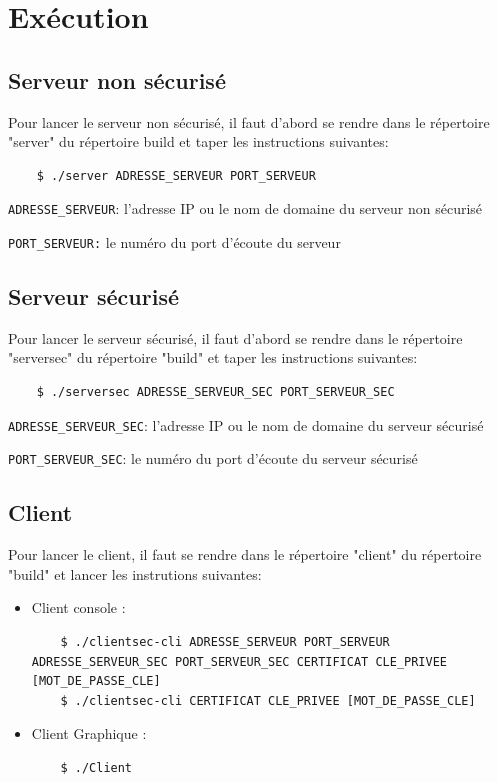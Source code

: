 \documentclass[a4paper,11pt,french]{book}
\begin{document}
\section{Exécution}
\subsection{Serveur non sécurisé}
Pour lancer le serveur non sécurisé, il faut d'abord se rendre dans le répertoire "server" du répertoire build et taper les instructions suivantes:

\begin{verbatim}
    $ ./server ADRESSE_SERVEUR PORT_SERVEUR
\end{verbatim}

\verb+ADRESSE_SERVEUR+: l'adresse IP ou le nom de domaine du serveur non sécurisé

\verb+PORT_SERVEUR:+ le numéro du port d'écoute du serveur

\subsection{Serveur sécurisé}
Pour lancer le serveur sécurisé, il faut d'abord se rendre dans le répertoire "serversec" du répertoire "build" et taper les instructions suivantes:
\begin{verbatim}
    $ ./serversec ADRESSE_SERVEUR_SEC PORT_SERVEUR_SEC
\end{verbatim}

\verb+ADRESSE_SERVEUR_SEC+: l'adresse IP ou le nom de domaine du serveur sécurisé

\verb+PORT_SERVEUR_SEC+: le numéro du port d'écoute du serveur sécurisé

\subsection{Client}
Pour lancer le client, il faut se rendre dans le répertoire "client" du répertoire "build" et lancer les instrutions suivantes:
\begin{itemize}
\item Client console : 
\begin{verbatim}
    $ ./clientsec-cli ADRESSE_SERVEUR PORT_SERVEUR ADRESSE_SERVEUR_SEC PORT_SERVEUR_SEC CERTIFICAT CLE_PRIVEE [MOT_DE_PASSE_CLE]
    $ ./clientsec-cli CERTIFICAT CLE_PRIVEE [MOT_DE_PASSE_CLE]
\end{verbatim}
\item Client Graphique :
\begin{verbatim}
    $ ./Client
\end{verbatim}
\end{itemize}
\end{document}
